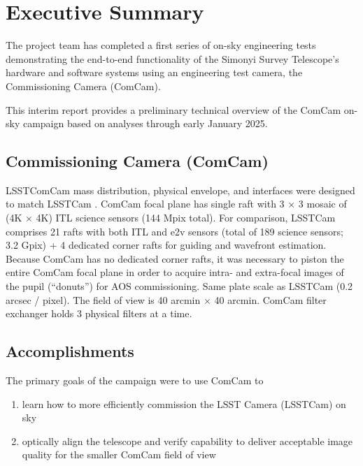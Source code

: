 \section{Executive Summary}
\label{sec:summary}

The \VeraRubinObservatory project team has completed a first series of on-sky engineering tests demonstrating the end-to-end functionality of the Simonyi Survey Telescope's hardware and software systems using an engineering test camera, the Commissioning Camera (ComCam).

\begin{note}
    This interim report provides a preliminary technical overview of the ComCam on-sky campaign based on analyses through early January 2025.
\end{note}

\emph{}

\subsection{Commissioning Camera (ComCam)}

LSSTComCam mass distribution, physical envelope, and interfaces were designed to match LSSTCam \citep{10.71929/rubin/2571927}.
ComCam focal plane has single raft with 3 $\times$ 3 mosaic of (4K $\times$ 4K) ITL science sensors (144 Mpix total).
For comparison, LSSTCam comprises 21 rafts with both ITL and e2v sensors (total of 189 science sensors; 3.2 Gpix) + 4 dedicated corner rafts for guiding and wavefront estimation.
Because ComCam has no dedicated corner rafts, it was necessary to piston the entire ComCam focal plane in
order to acquire intra- and extra-focal images of the pupil (``donuts'') for AOS commissioning.
Same plate scale as LSSTCam (0.2 arcsec / pixel).
The field of view is 40 arcmin $\times$ 40 arcmin.
ComCam filter exchanger holds 3 physical filters at a time.

\subsection{Accomplishments}

The primary goals of the campaign were to use ComCam to

\begin{enumerate}
    \item learn how to more efficiently commission the LSST Camera (LSSTCam) on sky
    \item optically align the telescope and verify capability to deliver acceptable image quality for the smaller ComCam field of view
\end{enumerate}

